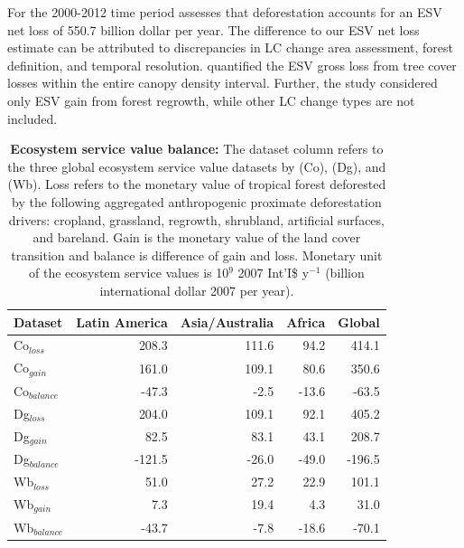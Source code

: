 		For the 2000-2012 time period \citet{Song2018} assesses that deforestation accounts for an \ac{ESV} net loss of 550.7 billion dollar per year. The difference to our \ac{ESV} net loss estimate can be attributed to discrepancies in \ac{LC} change area assessment, forest definition, and temporal resolution. \citet{Song2018} quantified the \ac{ESV} gross loss from tree cover losses within the entire canopy density interval. Further, the study considered only \ac{ESV} gain from forest regrowth, while other \ac{LC} change types are not included.
		\begin{table}[ht]
			\centering
			\caption[Ecosystem service value balance]{\textbf{Ecosystem service value balance:} The dataset column refers to the three global ecosystem service value datasets by \citet{Costanza2014} (Co), \citet{Groot2012} (Dg), and \citet{Siikamaki2015} (Wb). Loss refers to the monetary value of tropical forest deforested by the following aggregated anthropogenic proximate deforestation drivers: cropland, grassland, regrowth, shrubland, artificial surfaces, and bareland. Gain is the monetary value of the land cover transition and balance is difference of gain and loss. Monetary unit of the ecosystem service values is 10$^{9}$ 2007 Int'I\$ y$^{-1}$ (billion international dollar 2007 per year).}
			\label{tab:esv_results}
			\begin{tabular}{lrrrr}
				\hline
				Dataset & Latin America & Asia/Australia & Africa & Global\\
				\hline
				Co$_{loss}$ & 208.3 & 111.6 & 94.2 & 414.1 \\
				Co$_{gain}$ & 161.0 & 109.1 & 80.6 & 350.6 \\
				Co$_{balance}$ & -47.3 & -2.5 & -13.6 & -63.5\\
				Dg$_{loss}$ & 204.0 & 109.1 & 92.1 & 405.2\\
				Dg$_{gain}$ & 82.5 & 83.1 & 43.1 & 208.7\\
				Dg$_{balance}$ & -121.5 & -26.0 & -49.0 & -196.5\\
				Wb$_{loss}$ & 51.0 & 27.2 & 22.9 & 101.1\\
				Wb$_{gain}$ & 7.3 & 19.4 & 4.3 & 31.0 \\
				Wb$_{balance}$ & -43.7 & -7.8 & -18.6 & -70.1 \\
				\hline
			\end{tabular}
		\end{table}

